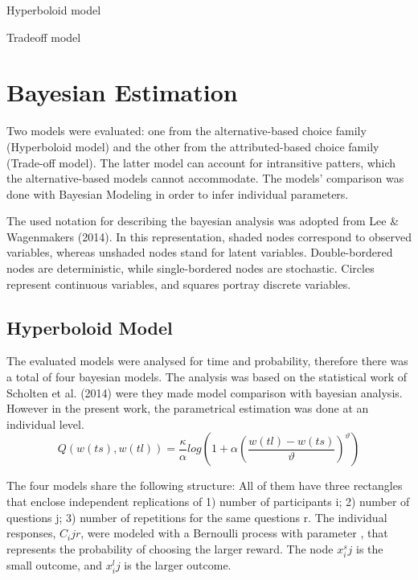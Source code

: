 \documentclass[jou,apacite]{apa6}
\begin{document}
Hyperboloid model

Tradeoff model 





\section{Bayesian Estimation}

Two models were evaluated: one from the alternative-based choice family (Hyperboloid model) and the other from the attributed-based choice family (Trade-off model). The latter model can account for intransitive patters, which the alternative-based models cannot accommodate. The models' comparison was done with Bayesian Modeling in order to infer individual parameters. 

The used notation for describing the bayesian analysis was adopted from Lee \& Wagenmakers (2014). In this representation, shaded nodes correspond to observed variables, whereas unshaded nodes stand for latent variables. Double-bordered nodes are deterministic, while single-bordered nodes are stochastic. Circles represent continuous variables, and squares portray discrete variables. 

\subsection{Hyperboloid Model}

The evaluated models were analysed for time and probability, therefore there was a total of four bayesian models. The analysis was based on the statistical work of Scholten et al. (2014) were they made model comparison with bayesian analysis. However in the present work, the parametrical estimation was done at an individual level. 
\begin{equation}
Q(w(ts),w(tl))= \frac{\kappa}{\alpha} log\left(1+\alpha \left(\frac{w(tl)-w(ts)}{\vartheta}\right) ^\vartheta \right)
\end{equation}

The four models share the following structure: All of them have three rectangles that enclose independent replications of 1) number of participants i; 2) number of questions j; 3) number of repetitions for the same questions r. The individual responses, $C_ijr$, were modeled with a Bernoulli process with parameter , that represents the probability of choosing the larger reward. The node $x^s_ij$ is the small outcome, and $x^l_ij$ is the larger outcome. 
\end{document}
